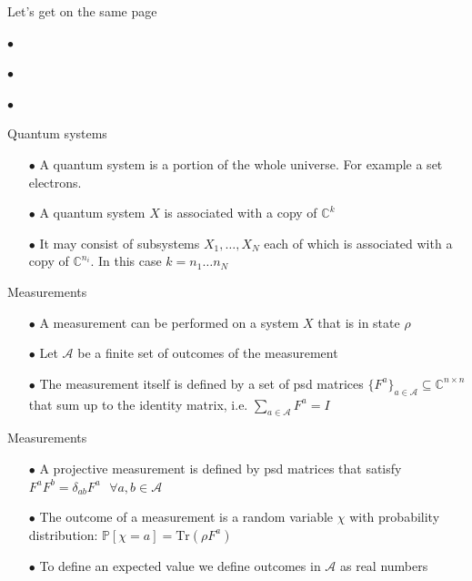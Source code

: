 \begin{frame}{Let's get on the same page}
 \begin{fullpageitemize}
  \item[$\bullet$] 
  \item[$\bullet$] 
  \item[$\bullet$] 
 \end{fullpageitemize}
\end{frame}

\begin{frame}{Quantum systems}
\begin{itemize}
\item[$\bullet$] A quantum system is a portion of the whole universe. For example a set electrons. 
\item[$\bullet$] A quantum system $X$ is associated with a copy of $\mathbb{C}^k$ 
\item[$\bullet$] It may consist of subsystems $X_1, \dots , X_N$ each of which is associated with a copy of $\mathbb{C}^{n_i}$. In this case $k = n_1 \dots n_N$
\end{itemize}
\end{frame}

\begin{frame}{Measurements}
\begin{itemize}
    \item[$\bullet$] A measurement can be performed on a system $X$ that is in state $\rho$
    \item[$\bullet$] Let $\mathcal{A}$ be a finite set of outcomes of the measurement
    \item[$\bullet$] The measurement itself is defined by a set of psd matrices $\{ F^a \}_{a\in \mathcal{A}} \subseteq \mathbb{C}^{n \times n}$ that sum up to the identity matrix, i.e. $\sum_{a \in \mathcal{A}} F^a = I$
\end{itemize}
\end{frame}

\begin{frame}{Measurements}
\begin{itemize}
    \item[$\bullet$] A projective measurement is defined by psd matrices that satisfy $F^aF^b = \delta_{ab}F^a \text{ } \forall a,b \in \mathcal{A}$
    \item[$\bullet$] The outcome of a measurement is a random variable $\chi$ with probability distribution: $\mathbb{P}[ \chi = a ] = \text{Tr}(\rho F^a)$
    \item[$\bullet$] To define an expected value we define outcomes in $\mathcal{A}$ as real numbers
\end{itemize}
    
\end{frame}


